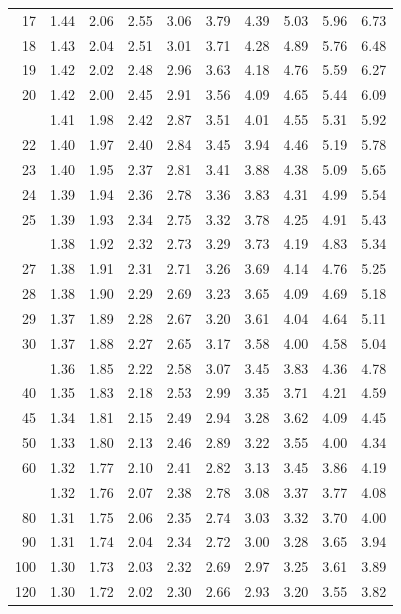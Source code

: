 \documentclass[10pt]{article}
\begin{document}
\begin{longtable}{@{}r!{\vrule width 0.8pt\hspace{0.55em}}rrrrrrrrr@{}}
17 & 1.44 & 2.06 & 2.55 & 3.06 & 3.79 & 4.39 & 5.03 & 5.96 & 6.73 \\
18 & 1.43 & 2.04 & 2.51 & 3.01 & 3.71 & 4.28 & 4.89 & 5.76 & 6.48 \\
19 & 1.42 & 2.02 & 2.48 & 2.96 & 3.63 & 4.18 & 4.76 & 5.59 & 6.27 \\
20 & 1.42 & 2.00 & 2.45 & 2.91 & 3.56 & 4.09 & 4.65 & 5.44 & 6.09 \\
 & 1.41 & 1.98 & 2.42 & 2.87 & 3.51 & 4.01 & 4.55 & 5.31 & 5.92 \\
22 & 1.40 & 1.97 & 2.40 & 2.84 & 3.45 & 3.94 & 4.46 & 5.19 & 5.78 \\
23 & 1.40 & 1.95 & 2.37 & 2.81 & 3.41 & 3.88 & 4.38 & 5.09 & 5.65 \\
24 & 1.39 & 1.94 & 2.36 & 2.78 & 3.36 & 3.83 & 4.31 & 4.99 & 5.54 \\
25 & 1.39 & 1.93 & 2.34 & 2.75 & 3.32 & 3.78 & 4.25 & 4.91 & 5.43 \\
 & 1.38 & 1.92 & 2.32 & 2.73 & 3.29 & 3.73 & 4.19 & 4.83 & 5.34 \\
27 & 1.38 & 1.91 & 2.31 & 2.71 & 3.26 & 3.69 & 4.14 & 4.76 & 5.25 \\
28 & 1.38 & 1.90 & 2.29 & 2.69 & 3.23 & 3.65 & 4.09 & 4.69 & 5.18 \\
29 & 1.37 & 1.89 & 2.28 & 2.67 & 3.20 & 3.61 & 4.04 & 4.64 & 5.11 \\
30 & 1.37 & 1.88 & 2.27 & 2.65 & 3.17 & 3.58 & 4.00 & 4.58 & 5.04 \\
 & 1.36 & 1.85 & 2.22 & 2.58 & 3.07 & 3.45 & 3.83 & 4.36 & 4.78 \\
40 & 1.35 & 1.83 & 2.18 & 2.53 & 2.99 & 3.35 & 3.71 & 4.21 & 4.59 \\
45 & 1.34 & 1.81 & 2.15 & 2.49 & 2.94 & 3.28 & 3.62 & 4.09 & 4.45 \\
50 & 1.33 & 1.80 & 2.13 & 2.46 & 2.89 & 3.22 & 3.55 & 4.00 & 4.34 \\
60 & 1.32 & 1.77 & 2.10 & 2.41 & 2.82 & 3.13 & 3.45 & 3.86 & 4.19 \\
 & 1.32 & 1.76 & 2.07 & 2.38 & 2.78 & 3.08 & 3.37 & 3.77 & 4.08 \\
80 & 1.31 & 1.75 & 2.06 & 2.35 & 2.74 & 3.03 & 3.32 & 3.70 & 4.00 \\
90 & 1.31 & 1.74 & 2.04 & 2.34 & 2.72 & 3.00 & 3.28 & 3.65 & 3.94 \\
100 & 1.30 & 1.73 & 2.03 & 2.32 & 2.69 & 2.97 & 3.25 & 3.61 & 3.89 \\
120 & 1.30 & 1.72 & 2.02 & 2.30 & 2.66 & 2.93 & 3.20 & 3.55 & 3.82 \\

\end{longtable}
\end{document}
